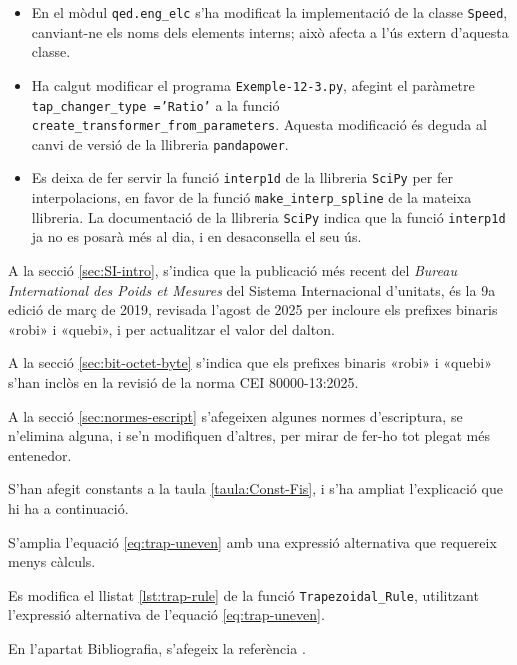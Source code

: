 \begin{itemize}
    \item En el mòdul \texttt{qed.eng\_elc} s'ha modificat la implementació  de la classe \texttt{Speed}, canviant-ne els noms dels elements interns; això afecta a l'ús extern d'aquesta classe.

    \item Ha calgut modificar el programa \texttt{Exemple-12-3.py}, afegint el paràmetre \texttt{tap\_changer\_type ='Ratio'} a la funció \texttt{create\_transformer\_from\_parameters}.
     Aquesta modificació és deguda al canvi de versió de la llibreria \texttt{pandapower}.

    \item Es deixa de fer servir la funció \texttt{interp1d} de la llibreria \texttt{SciPy} per fer interpolacions, en favor de  la funció \texttt{make\_interp\_spline} de la mateixa llibreria.
    La documentació de la llibreria \texttt{SciPy} indica que la  funció \texttt{interp1d} ja no es posarà més al dia, i en desaconsella el seu ús.
\end{itemize}

A la secció \ref{sec:SI-intro}, s'indica que la publicació més recent del \textit{Bureau 	International des Poids et Mesures} del Sistema Internacional d'unitats, és la  9a edició de març de 2019, revisada l'agost de 2025 per incloure els prefixes binaris «robi» i «quebi», i per actualitzar el valor del dalton.

A la secció \ref{sec:bit-octet-byte} s'indica que els prefixes binaris «robi» i «quebi»  s'han inclòs en la revisió de la norma CEI 80000-13:2025.

A la secció \ref{sec:normes-escript} s'afegeixen algunes normes d'escriptura, se n'elimina alguna, i se'n modifiquen d'altres, per mirar de  fer-ho tot plegat més entenedor.

S'han afegit constants a la taula \ref{taula:Const-Fis}, i s'ha ampliat l'explicació que hi ha a continuació.

S'amplia l'equació \eqref{eq:trap-uneven} amb una expressió alternativa que requereix menys càlculs.

Es modifica el llistat \ref{lst:trap-rule} de la funció \texttt{Trapezoidal\_Rule}, utilitzant l'expressió alternativa de l'equació \eqref{eq:trap-uneven}.

En l'apartat Bibliografia, s'afegeix la referència \cite{SSMH}.
